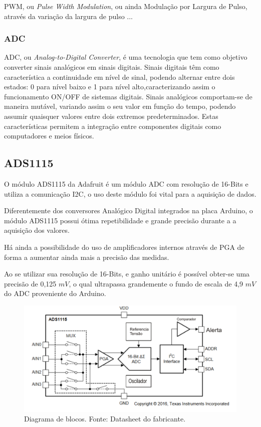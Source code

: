 PWM, ou \textit{Pulse Width Modulation}, ou ainda Modulação por Largura de Pulso, através da variação da largura de pulso ...

\subsubsection{ADC}

ADC, ou \textit{Analog-to-Digital Converter}, é uma tecnologia que tem como objetivo converter sinais analógicos em sinais digitais. Sinais digitais têm como característica a continuidade em nível de sinal, podendo alternar entre dois estados: 0 para nível baixo e 1 para nível alto,caracterizando assim o funcionamento ON/OFF de sistemas digitais.
 Sinais analógicos comportam-se de maneira mutável, variando assim o seu valor em função do tempo, podendo assumir quaisquer valores entre dois extremos predeterminados. Estas características permitem a integração entre componentes digitais como computadores e meios físicos.

\subsection{ADS1115}
O módulo ADS1115 da Adafruit é um módulo ADC com resolução de 16-Bits e utiliza a comunicação I2C, o uso deste módulo foi vital para a aquisição de dados.

Diferentemente dos conversores Analógico Digital integrados na placa Arduino, o módulo ADS1115 possui ótima repetibilidade e grande precisão durante a a aquisição dos valores.

Há ainda a possibilidade do uso de amplificadores internos através de PGA de forma a aumentar ainda mais a precisão das medidas.

Ao se utilizar sua resolução de 16-Bits, e ganho unitário é possível obter-se uma precisão de 0,125 $mV$, o qual ultrapassa grandemente o fundo de escala de 4,9 $mV$ do ADC proveniente do Arduino.%
\FloatBarrier
\begin{figure}[!htbp]
	\centering
	\includegraphics[scale=0.7]{imagens/ADS}
	\caption{Diagrama de blocos. Fonte: Datasheet do fabricante. }%
	
	\label{fig:Ads}
\end{figure}
\FloatBarrier

